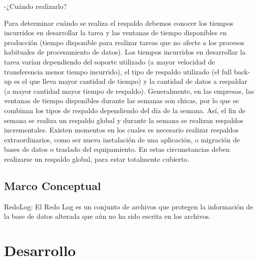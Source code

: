 \documentclass[12pt,letterpaper]{article}
\begin{document}
\newpage

-¿Cuándo realizarlo? 

Para determinar cuándo se realiza el respaldo debemos conocer los tiempos incurridos en desarrollar la tarea y las ventanas de tiempo disponibles en producción (tiempo disponible para realizar tareas que no afecte a los procesos habituales de procesamiento de datos). Los tiempos incurridos en desarrollar la tarea varían dependiendo del soporte utilizado (a mayor velocidad de transferencia menor tiempo incurrido), el tipo de respaldo utilizado (el full back-up es el que lleva mayor cantidad de tiempo) y la cantidad de datos a respaldar (a mayor cantidad mayor tiempo de respaldo). 
Generalmente, en las empresas, las ventanas de tiempo disponibles durante las semanas son chicas, por lo que se combinan los tipos de respaldo  dependiendo del día de la semana. Así, el fin de semana se realiza un respaldo global y durante la semana se realizan respaldos incrementales. Existen momentos en los cuales es necesario realizar respaldos extraordinarios, como ser nueva instalación de una aplicación, o migración de bases de datos o traslado del equipamiento. En estas circunstancias deben realizarse un respaldo global, para estar totalmente cubierto. \\







\subsection{Marco Conceptual}

\newpage

RedoLog: El Redo Log es un conjunto de archivos que protegen la información de la base de datos alterada que aún no ha sido escrita en los archivos.
\section{Desarrollo}
\end{document}
